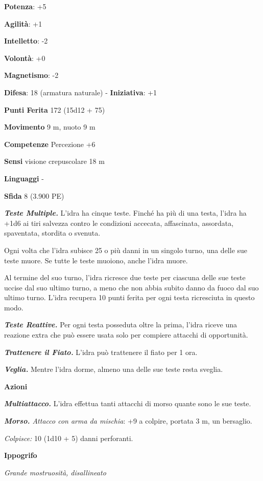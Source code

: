 \begin{multicols}{2}
\textbf{Potenza}: +5

\textbf{Agilità}: +1

\textbf{Intelletto}: -2

\textbf{Volontà}: +0

\textbf{Magnetismo}: -2

\textbf{Difesa}: 18 (armatura naturale) - \textbf{Iniziativa}: +1

\textbf{Punti Ferita} 172 (15d12 + 75)

\textbf{Movimento} 9 m, nuoto 9 m

\textbf{Competenze} Percezione +6

\textbf{Sensi} visione crepuscolare 18 m

\textbf{Linguaggi} -

\textbf{Sfida} 8 (3.900 PE)\smallskip

\emph{\textbf{Teste Multiple.}} L'idra ha cinque teste. Finché ha più di
una testa, l'idra ha +1d6 ai tiri salvezza contro le condizioni
accecata, affascinata, assordata, spaventata, stordita o svenuta.

Ogni volta che l'idra subisce 25 o più danni in un singolo turno, una
delle sue teste muore. Se tutte le teste muoiono, anche l'idra muore.

Al termine del suo turno, l'idra ricresce due teste per ciascuna delle
sue teste uccise dal suo ultimo turno, a meno che non abbia subito danno
da fuoco dal suo ultimo turno. L'idra recupera 10 punti ferita per ogni
testa ricresciuta in questo modo.

\emph{\textbf{Teste Reattive.}} Per ogni testa posseduta oltre la prima,
l'idra riceve una reazione extra che può essere usata solo per compiere
attacchi di opportunità.

\emph{\textbf{Trattenere il Fiato.}} L'idra può trattenere il fiato per
1 ora.

\emph{\textbf{Veglia.}} Mentre l'idra dorme, almeno una delle sue teste
resta sveglia.

\smallskip\textbf{Azioni}

\emph{\textbf{Multiattacco.}} L'idra effettua tanti attacchi di morso
quante sono le sue teste.

\emph{\textbf{Morso.} Attacco con arma da mischia}: +9 a colpire,
portata 3 m, un bersaglio.

\emph{Colpisce:} 10 (1d10 + 5) danni perforanti.

\textbf{Ippogrifo}

\emph{Grande mostruosità, disallineato}


\end{multicols}
